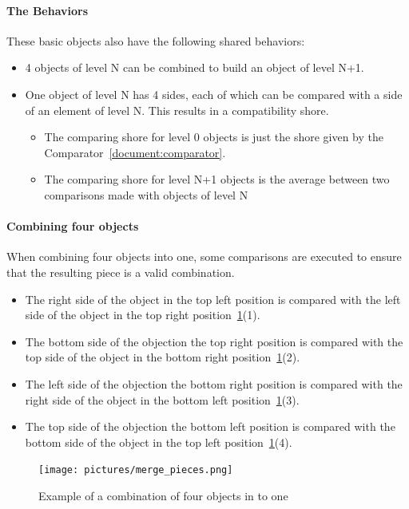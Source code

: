 \documentclass{article}
\begin{document}
\paragraph{The Behaviors}

These basic objects also have the following shared behaviors:
\begin{itemize}
  \item 4 objects of level N can be combined to build an object of level N+1.
  \item One object of level N has 4 sides, each of which can be compared with a side of an element of level N. This results in a compatibility shore.
  \begin{itemize}
    \item The comparing shore for level 0 objects is just the shore given by the Comparator~\cref{document:comparator}.
    \item The comparing shore for level N+1 objects is the average between two comparisons made with objects of level N
  \end{itemize}
\end{itemize}

\paragraph{Combining four objects}\label{document:combining_four_objects}

When combining four objects into one, some comparisons are executed to ensure that the resulting piece is a valid  combination.
\begin{itemize}
  \item The right side of the object in the top left position is compared with the left side of the object in the top right position~\cref{fig:merge_pieces}(1).
  \item The bottom side of the objection the top right position is compared with the top side of the object in the bottom right position~\cref{fig:merge_pieces}(2).
  \item The left side of the objection the bottom right position is compared with the right side of the object in the bottom left position~\cref{fig:merge_pieces}(3).
  \item The top side of the objection the bottom left position is compared with the bottom side of the object in the top left position~\cref{fig:merge_pieces}(4).
\end{itemize}

\begin{figure}[H]
  \caption{Example of a combination of four objects in to one}\label{fig:merge_pieces}
  \centering
  \texttt{[image: pictures/merge\_pieces.png]}
\end{figure}
\end{document}
